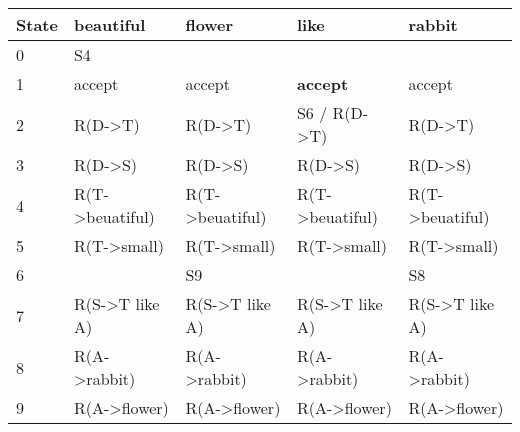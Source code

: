 \begin{center}
\begin{latin}
\begin{tabular}{|l|l|l|l|l|}
\hline
State & beautiful                    & flower                       & like                         & rabbit                       \\ \hline
0     & S4                           &                              &                              &                              \\ \hline
1     & accept                       & accept                       & \textbf{accept}              & accept                       \\ \hline
2     & R(D-\textgreater{}T)         & R(D-\textgreater{}T)         & S6 / R(D-\textgreater{}T)    & R(D-\textgreater{}T)         \\ \hline
3     & R(D-\textgreater{}S)         & R(D-\textgreater{}S)         & R(D-\textgreater{}S)         & R(D-\textgreater{}S)         \\ \hline
4     & R(T-\textgreater{}beuatiful) & R(T-\textgreater{}beuatiful) & R(T-\textgreater{}beuatiful) & R(T-\textgreater{}beuatiful) \\ \hline
5     & R(T-\textgreater{}small)     & R(T-\textgreater{}small)     & R(T-\textgreater{}small)     & R(T-\textgreater{}small)     \\ \hline
6     &                              & S9                           &                              & S8                           \\ \hline
7     & R(S-\textgreater{}T like A)  & R(S-\textgreater{}T like A)  & R(S-\textgreater{}T like A)  & R(S-\textgreater{}T like A)  \\ \hline
8     & R(A-\textgreater{}rabbit)    & R(A-\textgreater{}rabbit)    & R(A-\textgreater{}rabbit)    & R(A-\textgreater{}rabbit)    \\ \hline
9     & R(A-\textgreater{}flower)    & R(A-\textgreater{}flower)    & R(A-\textgreater{}flower)    & R(A-\textgreater{}flower)    \\ \hline
\end{tabular}


\end{latin}
\end{center}
